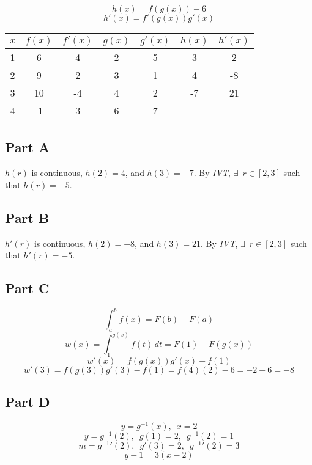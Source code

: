 \[ h(x) = f(g(x))-6 \]
\[ h'(x) = f'(g(x))g'(x) \]
\begin{center}
	\begin{tabular}{ | c || c | c | c | c | c | c | }
		\hline
		\rule{0pt}{4ex}
		$x$ & $f(x)$ & $f'(x)$ & $g(x)$ & $g'(x)$ & $h(x)$ & $h'(x)$ \\
		\hline
		\hline
		1 & 6  & 4  & 2 & 5 & 3  & 2 \\
		\hline
		2 & 9  & 2  & 3 & 1 & 4  & -8 \\
		\hline
		3 & 10 & -4 & 4 & 2 & -7 & 21 \\
		\hline
		4 & -1 & 3  & 6 & 7 & & \\
		\hline
	\end{tabular}
\end{center}

\subsection{Part A}
$h(r)$ is continuous, $h(2) = 4$, and $h(3) = -7$. By \textit{IVT}, $\exists \enspace r \in [2, 3]$ such that $h(r) = -5$.

\subsection{Part B}
$h'(r)$ is continuous, $h(2) = -8$, and $h(3) = 21$. By \textit{IVT}, $\exists \enspace r \in [2, 3]$ such that $h'(r) = -5$.

\subsection{Part C}
\[ \int_{a}^{b} f(x) = F(b) - F(a) \]
\[ w(x) = \int_{1}^{g(x)} f(t)\,dt = F(1) - F(g(x)) \]
\[ w'(x) = f(g(x))g'(x) - f(1) \]
\[ w'(3) = f(g(3))g'(3) - f(1) = f(4)(2) - 6 = -2 - 6 = -8 \]

\subsection{Part D}
\[ y = g^{-1}(x), \enspace x = 2 \]
\[ y = g^{-1}(2), \enspace g(1) = 2, \enspace g^{-1}(2) = 1 \]
\[ m = g^{-1}'(2), \enspace g'(3) = 2, \enspace g^{-1}'(2) = 3 \]
\[ y - 1 = 3(x - 2) \]
